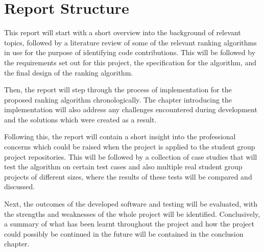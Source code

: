 \documentclass[11pt]{informatics-report}
\begin{document}
\section{Report Structure}
This report will start with a short overview into the background of relevant topics, followed by a literature review of some of the relevant ranking algorithms in use for the purpose of identifying code contributions. This will be followed by the requirements set out for this project, the specification for the algorithm, and the final design of the ranking algorithm.

Then, the report will step through the process of implementation for the proposed ranking algorithm chronologically. The chapter introducing the implementation will also address any challenges encountered during development and the solutions which were created as a result. 

Following this, the report will contain a short insight into the professional concerns which could be raised when the project is applied to the student group project repositories. This will be followed by a collection of case studies that will test the algorithm on certain test cases and also multiple real student group projects of different sizes, where the results of these tests will be compared and discussed. 

Next, the outcomes of the developed software and testing will be evaluated, with the strengths and weaknesses of the whole project will be identified. Conclusively, a summary of what has been learnt throughout the project and how the project could possibly be continued in the future will be contained in the conclusion chapter.



%
%
%
%





%
%
\end{document}
